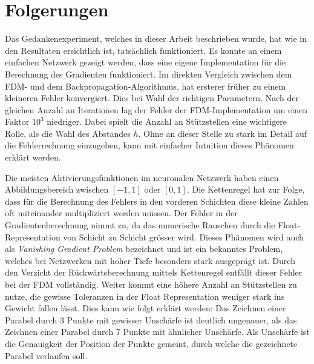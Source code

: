 %
%
%
\section{Folgerungen
\label{ableitung:section:folgerungen}}
Das Gedankenexperiment, welches in dieser Arbeit beschrieben wurde, hat wie in den Resultaten ersichtlich ist, tatsächlich funktioniert. Es konnte an einem einfachen Netzwerk gezeigt werden, dass eine eigene Implementation für die Berechnung des Gradienten funktioniert. Im direkten Vergleich zwischen dem FDM- und dem Backpropagation-Algorithmus, hat ersterer früher zu einem kleineren Fehler konvergiert. Dies bei Wahl der richtigen Parametern. Nach der gleichen Anzahl an Iterationen lag der Fehler der FDM-Implementation um einen Faktor $10^3$ niedriger. Dabei spielt die Anzahl an Stützstellen eine wichtigere Rolle, als die Wahl des Abstandes $h$. Ohne an dieser Stelle zu stark im Detail auf die Fehlerrechnung einzugehen, kann mit einfacher Intuition dieses Phänomen erklärt werden.

Die meisten Aktivierungsfunktionen im neuronalen Netzwerk haben einen Abbildungsbereich zwischen $[-1, 1]$ oder $[0, 1]$. Die Kettenregel hat zur Folge, dass für die Berechnung des Fehlers in den vorderen Schichten diese kleine Zahlen oft miteinander multipliziert werden müssen. Der Fehler in der Gradientenberechnung nimmt zu, da das numerische Rauschen durch die Float-Representation von Schicht zu Schicht grösser wird. Dieses Phänomen wird auch als \textit{Vanishing Gradient Problem} bezeichnet und ist ein bekanntes Problem, welches bei Netzwerken mit hoher Tiefe besonders stark ausgeprägt ist. Durch den Verzicht der Rückwärtsberechnung mittels Kettenregel entfällt dieser Fehler bei der FDM vollständig. Weiter kommt eine höhere Anzahl an Stützstellen zu nutze, die gewisse Toleranzen in der Float Representation weniger stark ins Gewicht fallen lässt. Dies kann wie folgt erklärt werden: Das Zeichnen einer Parabel durch 3 Punkte mit gewisser Unschärfe ist deutlich ungenauer, als das Zeichnen einer Parabel durch 7 Punkte mit ähnlicher Unschärfe. Als Unschärfe ist die Genauigkeit der Position der Punkte gemeint, durch welche die gezeichnete Parabel verlaufen soll.

